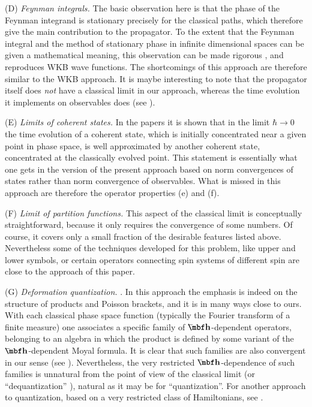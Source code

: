 \item{(D)}
{\it Feynman integrals.} The basic observation here is that the
phase of the Feynman integrand is stationary precisely for the
classical paths, which therefore give the main contribution to the
propagator. To the extent that the Feynman integral and the method
of stationary phase in infinite dimensional spaces can be given a
mathematical meaning, this observation can be made rigorous
\cite{Aubrey,Albeverio}, and reproduces WKB wave functions. The
shortcomings of this approach are therefore similar to the WKB
approach. It is maybe interesting to note that the propagator itself
does {\it not} have a classical limit in our approach, whereas the
time evolution it implements on observables does (see ).

\item{(E)}
{\it Limits of coherent states.}
In the papers \cite{Hepp,Hagedorn} it is shown that in the limit
$\hbar\to0$ the time evolution of a coherent state, which is
initially concentrated near a given point in phase space, is well
approximated by another coherent state, concentrated at the
classically evolved point. This statement is essentially what one
gets in the version of the present approach based on norm
convergences of states \cite{CLN} rather than norm convergence of
observables. What is missed in this approach are therefore the
operator properties (e) and (f).

\item{(F)}
{\it Limit of partition functions.}
\cite{Liebspin,Simon,Liebcoh,Wresin}
This aspect of the classical limit is conceptually straightforward,
because it only requires the convergence of some numbers. Of course,
it covers only a small fraction of the desirable features listed above.
Nevertheless some of the techniques developed for this problem, like
upper and lower symbols, or certain operators connecting spin
systems of different spin \cite{Liebcoh} are close to the approach
of this paper.

\item{(G)}
{\it Deformation quantization.}
\cite{Rieffel,RieffAMS,Landsman}.
In this approach the emphasis is indeed on the structure of products
and Poisson brackets, and it is in many ways close to ours. With
each classical phase space function (typically the Fourier transform
of a finite measure) one associates a specific family of
$\hb$-dependent operators, belonging to an algebra in which the
product is defined by some variant of the $\hb$-dependent Moyal
formula. It is clear that such families are also convergent
in our sense (see ). Nevertheless, the very restricted
$\hb$-dependence of such families is unnatural from the point of
view of the classical limit (or ``dequantization'' \cite{Emch}),
natural as it may be for ``quantization''. For another approach to
quantization, based on a very restricted class of Hamiltonians, see
\cite{Belliss}.

